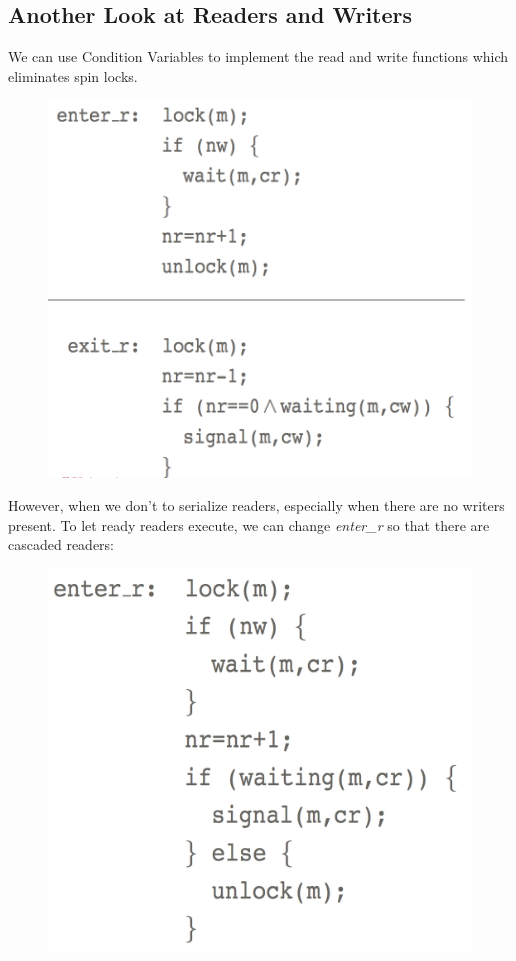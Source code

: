 \documentclass{hw}
\begin{document}
\subsection{Another Look at Readers and Writers}
We can use Condition Variables to implement the read and write functions which 
eliminates spin locks.
\begin{figure}[H]
  \centering
  \includegraphics[scale=.5]{condition}
\end{figure}
However, when we don't to serialize readers, especially when there are no writers
present. To let ready readers execute, we can change \emph{enter\_r} so that there
are cascaded readers:
\begin{figure}[H]
  \centering
  \includegraphics[scale=.4]{cascade}
\end{figure}
\end{document}
